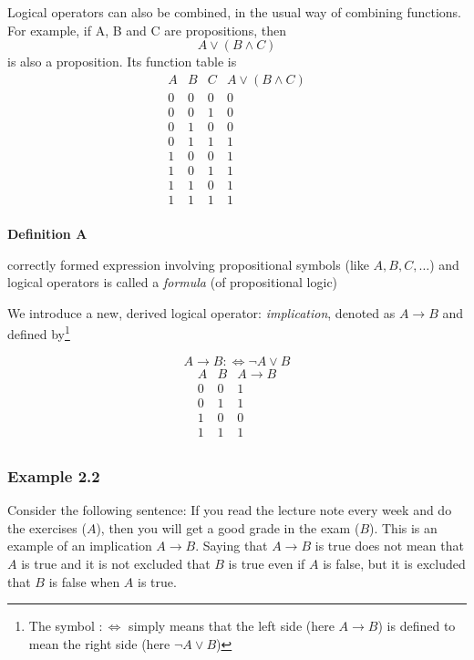 \documentclass[a4paper]{report}
\newenvironment{definition}[1]{\begin{framed}\centerline{\textbf{Definition #1}}\noindent\hspace{-1.1mm}}{\end{framed}}
\begin{document}
Logical operators can also be combined, in the usual way of combining functions. For example, if A, B and C are propositions, then
\[ A\lor (B\land C)\] is also a proposition. Its function table is
\begin{displaymath}
\begin{array}{c|c|c||c}
   A
 & B
 & C
 & A\lor{}(B\land{}C) \\
\hline
0 & 0 & 0 & 0 \\
0 & 0 & 1 & 0 \\
0 & 1 & 0 & 0 \\
0 & 1 & 1 & 1 \\
1 & 0 & 0 & 1 \\
1 & 0 & 1 & 1 \\
1 & 1 & 0 & 1 \\
1 & 1 & 1 & 1 \\
\end{array}
\end{displaymath}
\begin{definition}{2.6}
A correctly formed expression involving propositional symbols (like $A,B,C,\dots$) and logical operators is called a \emph{formula} (of propositional logic)
\end{definition}
We introduce a new, derived logical operator: \emph{implication}, denoted as $A\to B$ and defined by\footnote{The symbol $:\Longleftrightarrow$ simply means that the left side (here $A\to B$) is defined to mean the right side (here $\lnot A\lor B$)}
\begin{multicols}{2}
\null\vfill
\[A\to B:\Longleftrightarrow\lnot A\lor B\]
\null\vfill
\columnbreak
\null\vfill
\begin{displaymath}
\begin{array}{c|c||c}
   A
 & B
 &A\to B \\
\hline
0 & 0 & 1 \\
0 & 1 & 1 \\
1 & 0 & 0 \\
1 & 1 & 1 \\
\end{array}
\end{displaymath}
\null\vfill
\end{multicols}
\subsubsection*{Example 2.2}
Consider the following sentence: If you read the lecture note every week and do the exercises ($A$), then you will get a good grade in the exam ($B$). This is an example of an implication $A\to B$. Saying that $A\to B$ is true does not mean that $A$ is true and it is not excluded that $B$ is true even if $A$ is false, but it is excluded that $B$ is false when $A$ is true.\\
\end{document}
